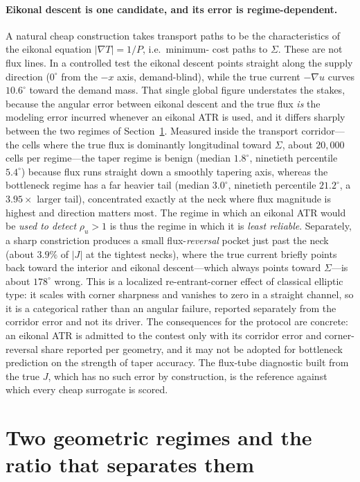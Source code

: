 \documentclass[11pt]{article}
\theoremstyle{remark}
\newcommand{\Sig}{\Sigma}
\newcommand{\rhou}{\rho_u}
\begin{document}
\paragraph{Eikonal descent is one candidate, and its error is
regime-dependent.} A natural cheap construction takes transport paths to be the
characteristics of the eikonal equation $\lvert\nabla T\rvert=1/P$, i.e.\ minimum-
cost paths to $\Sig$. These are not flux lines. In a controlled test the eikonal
descent points straight along the supply direction ($0^\circ$ from the $-x$ axis,
demand-blind), while the true current $-\nabla u$ curves $10.6^\circ$ toward the
demand mass. That single global figure understates the stakes, because the angular
error between eikonal descent and the true flux \emph{is} the modeling error
incurred whenever an eikonal ATR is used, and it differs sharply between the two
regimes of Section~\ref{sec:regimes}. Measured inside the transport corridor---the
cells where the true flux is dominantly longitudinal toward $\Sig$, about
$20{,}000$ cells per regime---the taper regime is benign (median $1.8^\circ$,
ninetieth percentile $5.4^\circ$) because flux runs straight down a smoothly
tapering axis, whereas the bottleneck regime has a far heavier tail (median
$3.0^\circ$, ninetieth percentile $21.2^\circ$, a $3.95\times$ larger tail),
concentrated exactly at the neck where flux magnitude is highest and direction
matters most. The regime in which an eikonal ATR would be \emph{used to detect}
$\rhou>1$ is thus the regime in which it is \emph{least reliable}. Separately, a
sharp constriction produces a small flux-\emph{reversal} pocket just past the neck
(about $3.9\%$ of $\lvert J\rvert$ at the tightest necks), where the true current
briefly points back toward the interior and eikonal descent---which always points
toward $\Sig$---is about $178^\circ$ wrong. This is a localized re-entrant-corner
effect of classical elliptic type: it scales with corner sharpness and vanishes to
zero in a straight channel, so it is a categorical rather than an angular failure,
reported separately from the corridor error and not its driver. The consequences
for the protocol are concrete: an eikonal ATR is admitted to the contest only with
its corridor error and corner-reversal share reported per geometry, and it may not
be adopted for bottleneck prediction on the strength of taper accuracy. The
flux-tube diagnostic built from the true $J$, which has no such error by
construction, is the reference against which every cheap surrogate is scored.

\section{Two geometric regimes and the ratio that separates them}\label{sec:regimes}
\end{document}
